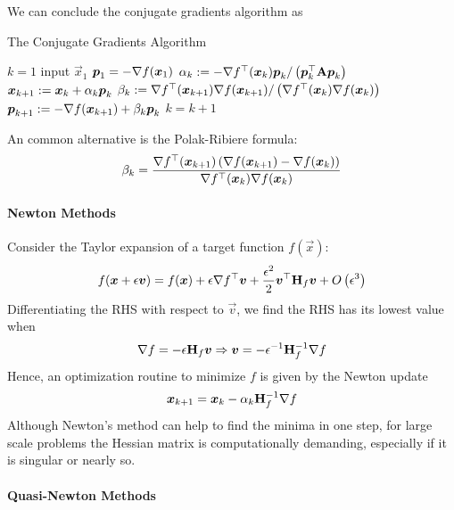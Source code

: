 We can conclude the conjugate gradients algorithm as
\begin{algorithm}[H]
	\caption{The Conjugate Gradients Algorithm}
	\begin{algorithmic}
		\State $k=1$
		\State input $\vec{x}_1$
		\State $\boldsymbol{p}_1=-\nabla f(\boldsymbol{x}_1)$
			\State $\alpha_k:=-\nabla f^\top(\boldsymbol{x}_k)\boldsymbol{p}_k/\left(\boldsymbol{p}_k^\top\mathbf{A}\boldsymbol{p}_k\right)$
			\State $\boldsymbol{x}_{k+1}:=\boldsymbol{x}_k+\alpha_k\boldsymbol{p}_k$
			\State $\beta_k:=\nabla f^\top(\boldsymbol{x}_{k+1})\nabla f(\boldsymbol{x}_{k+1})/\left(\nabla f^\top(\boldsymbol{x}_k)\nabla f(\boldsymbol{x}_k)\right)$
			\State $\boldsymbol{p}_{k+1}:=-\nabla f(\boldsymbol{x}_{k+1})+\beta_k\boldsymbol{p}_k$
			\State $k=k+1$
		\EndWhile
	\end{algorithmic}
\end{algorithm}
An common alternative is the Polak-Ribiere formula:
\begin{align*}
	\beta_k=\frac{\nabla f^\top(\boldsymbol{x}_{k+1})\left(\nabla f(\boldsymbol{x}_{k+1})-\nabla f(\boldsymbol{x}_k)\right)}{\nabla f^\top(\boldsymbol{x}_k)\nabla f(\boldsymbol{x}_k)}
\end{align*}

\paragraph{Newton Methods}

Consider the Taylor expansion of a target function $f(\vec{x})$:
\begin{align*}
	f(\boldsymbol{x}+\epsilon\boldsymbol{v})=f(\boldsymbol{x})+\epsilon\nabla f{}^\top\boldsymbol{v}+\frac{\epsilon^2}{2}\boldsymbol{v}{}^\top \mathbf{H}_f\boldsymbol{v}+O\left(\epsilon^3\right)
\end{align*}
Differentiating the RHS with respect to $\vec{v}$, we find the RHS has its lowest value when
\begin{align*}
	\nabla f=-\epsilon\mathbf{H}_f\boldsymbol{v}\Rightarrow\boldsymbol{v}=-\epsilon^{-1}\mathbf{H}_f^{-1}\nabla f
\end{align*}
Hence, an optimization routine to minimize $f$ is given by the Newton update
\begin{align*}
	\boldsymbol{x}_{k+1}=\boldsymbol{x}_k-\alpha_k\mathbf{H}_f^{-1}\nabla f
\end{align*}
Although Newton's method can help to find the minima in one step, for large scale problems the Hessian matrix is computationally demanding, especially if it is singular or nearly so.

\paragraph{Quasi-Newton Methods}

